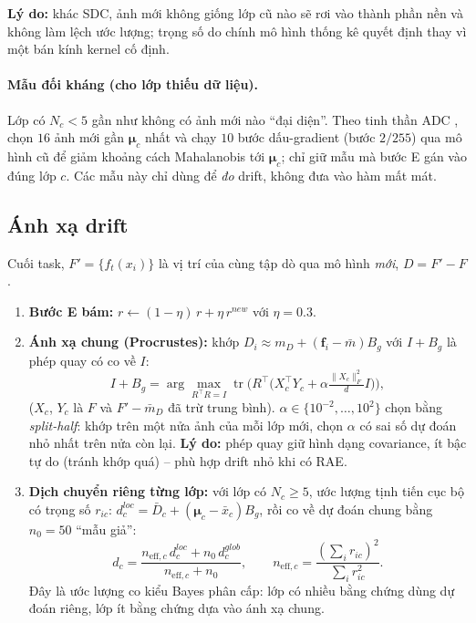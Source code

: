 \documentclass[11pt]{article}
\newcommand{\bmu}{\boldsymbol{\mu}}
\newcommand{\vf}{\mathbf{f}}
\newcommand{\tr}{\operatorname{tr}}
\begin{document}
\textbf{Lý do:} khác SDC, ảnh mới không giống lớp cũ nào sẽ rơi vào thành phần nền và không làm lệch ước lượng; trọng
số do chính mô hình thống kê quyết định thay vì một bán kính kernel cố định.

\paragraph{Mẫu đối kháng (cho lớp thiếu dữ liệu).} Lớp có $N_c<5$ gần như không có ảnh mới nào ``đại diện''. Theo
tinh thần ADC \cite{adc}, chọn $16$ ảnh mới gần $\bmu_c$ nhất và chạy $10$ bước dấu-gradient (bước $2/255$) qua mô hình
cũ để giảm khoảng cách Mahalanobis tới $\bmu_c$; chỉ giữ mẫu mà bước E gán vào đúng lớp $c$. Các mẫu này chỉ dùng để
\emph{đo} drift, không đưa vào hàm mất mát.

\subsection{Ánh xạ drift}
Cuối task, $F'=\{f_t(x_i)\}$ là vị trí của cùng tập dò qua mô hình \emph{mới}, $D=F'-F$.
\begin{enumerate}
\item \textbf{Bước E bám:} $r\leftarrow(1-\eta)\,r+\eta\,r^{new}$ với $\eta=0.3$.
\item \textbf{Ánh xạ chung (Procrustes):} khớp $D_i\approx m_D+(\vf_i-\bar m)B_g$ với $I+B_g$ là phép quay
\cite{procrustes} có co về $I$:
\begin{equation}
 I+B_g=\arg\max_{R^\top R=I}\tr\!\Big(R^\top\big(X_c^\top Y_c+\alpha\tfrac{\|X_c\|_F^2}{d}I\big)\Big),
\end{equation}
($X_c$, $Y_c$ là $F$ và $F'-\bar m_D$ đã trừ trung bình). $\alpha\in\{10^{-2},\dots,10^{2}\}$ chọn bằng
\emph{split-half}: khớp trên một nửa ảnh của mỗi lớp mới, chọn $\alpha$ có sai số dự đoán nhỏ nhất trên nửa còn lại.
\textbf{Lý do:} phép quay giữ hình dạng covariance, ít bậc tự do (tránh khớp quá) -- phù hợp drift nhỏ khi có RAE.
\item \textbf{Dịch chuyển riêng từng lớp:} với lớp có $N_c\ge5$, ước lượng tịnh tiến cục bộ có trọng số $r_{ic}$:
$d^{loc}_c=\bar D_c+(\bmu_c-\bar x_c)B_g$, rồi co về dự đoán chung bằng $n_0=50$ ``mẫu giả'':
\begin{equation}
 d_c=\frac{n_{\text{eff},c}\,d^{loc}_c+n_0\,d^{glob}_c}{n_{\text{eff},c}+n_0},\qquad
 n_{\text{eff},c}=\frac{(\sum_i r_{ic})^2}{\sum_i r_{ic}^2}.
\end{equation}
Đây là ước lượng co kiểu Bayes phân cấp: lớp có nhiều bằng chứng dùng dự đoán riêng, lớp ít bằng chứng dựa vào ánh xạ
chung.
\end{enumerate}
\end{document}
